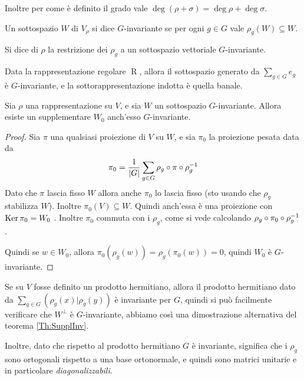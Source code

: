 \documentclass[a4paper,10pt,oneside]{math_article}
\newcommand{\herm}[2]{\left(#1 | #2\right)}
\DeclareMathOperator{\Reg}{R}
\begin{document}
    Inoltre per come è definito il grado vale $\deg(\rho+\sigma)=\deg\rho+\deg\sigma$.
    
    \begin{mydef}
     Un sottospazio $W$ di $V_\rho$ si dice $G$-invariante se per ogni $g\in G$ vale $\rho_g(W)\subseteq W$.
    \end{mydef}

    \begin{mydef}
     Si dice  di $\rho$ la restrizione dei $\rho_g$ a un sottospazio vettoriale $G$-invariante.
    \end{mydef}
    
    \begin{myexample}
      Data la rappresentazione regolare $\Reg$, allora il sottospazio generato da $\sum_{g\in G} e_g$ è $G$-invariante, e la sottorappresentazione indotta è quella banale.
    \end{myexample}
    
    \begin{mytheorem}\label{Th:SupplInv}
     Sia $\rho$ una rappresentazione su $V$, e sia $W$ un sottospazio $G$-invariante. Allora esiste un supplementare $W_0$ anch'esso $G$-invariante.
    \end{mytheorem}
    
    \begin{proof}
     Sia $\pi$ una qualsiasi proiezione di $V$ su $W$, e sia $\pi_0$ la proiezione pesata data da
     \[
      \pi_0=\frac1{\left|G\right|} \sum_{g\in G} \rho_g \circ \pi \circ \rho_g^{-1}
     \]
     Dato che $\pi$ lascia fisso $W$ allora anche $\pi_0$ lo lascia fisso (sto usando che $\rho_g$ stabilizza $W$). Inoltre $\pi_0(V) \subseteq W$. Quindi anch'essa è una proiezione con $\operatorname{Ker} \pi_0=W_0$ . Inoltre $\pi_0$ commuta con i $\rho_g$, come si vede calcolando $\rho_g \circ \pi_0 \circ \rho_g^{-1}$.
     
     Quindi se $w\in W_0$, allora $\pi_0 (\rho_g(w))=\rho_g(\pi_0(w))=0$, quindi $W_0$ è $G$-invariante.
    \end{proof}
    \begin{myobs}
     Se su $V$ fosse definito un prodotto hermitiano, allora il prodotto hermitiano dato da $\sum_{g\in G}\herm {\rho_g(x)}{\rho_g(y)}$ è invariante per $G$, quindi si può facilmente verificare che $W^\perp$ è $G$-invariante, abbiamo così una dimostrazione alternativa del teorema \ref{Th:SupplInv}.
     
     Inoltre, dato che rispetto al prodotto hermitiano $G$ è invariante, significa che i $\rho_g$ sono ortogonali rispetto a una base ortonormale, e quindi sono matrici unitarie e in particolare \emph{diagonalizzabili}.
    \end{myobs}
\end{document}
